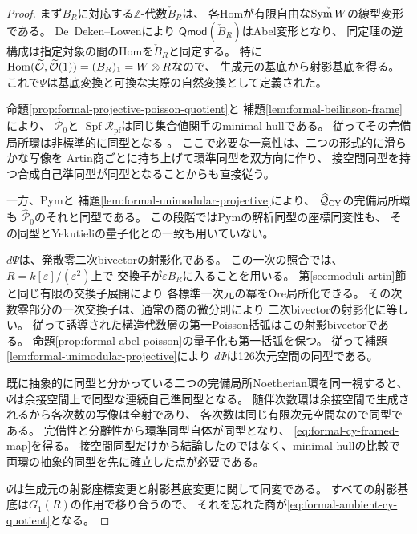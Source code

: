 \begin{proof}
まず$B_R$に対応する$\mathbb Z$-代数$\check B_R$は、
各Homが有限自由な$\check{\operatorname{Sym} W}$の線型変形である。
De~Deken--Lowen\cite[Proposition~4.4, Theorem~4.5]{DeDekenLowen}により
$\mathsf{Qmod}(\check B_R)$はAbel変形となり、
同定理の逆構成は指定対象の間のHomを$\check B_R$と同定する。
特に$\operatorname{Hom}(\widetilde{\mathcal O},\widetilde{\mathcal O}(1))=(B_R)_1=W\otimes R$なので、
生成元の基底から射影基底を得る。
これで$\Psi$は基底変換と可換な実際の自然変換として定義された。

命題\ref{prop:formal-projective-poisson-quotient}と
補題\ref{lem:formal-beilinson-frame}により、
$\widehat{\mathcal P}_0$と
$\operatorname{Spf}\mathcal R_{\mathrm{pf}}$は同じ集合値関手のminimal hullである。
従ってその完備局所環は非標準的に同型となる
\cite[Tag~06T5]{StacksFormal}。
ここで必要な一意性は、二つの形式的に滑らかな写像を
Artin商ごとに持ち上げて環準同型を双方向に作り、
接空間同型を持つ合成自己準同型が同型となることからも直接従う。

一方、Pym\cite[Proposition~2.9]{Pym}と
補題\ref{lem:formal-unimodular-projective}により、
$\widehat{\mathcal Q}_{\mathrm{CY}}$の完備局所環も
$\widehat{\mathcal P}_0$のそれと同型である。
この段階ではPymの解析同型の座標同変性も、
その同型とYekutieliの量子化との一致も用いていない。

$d\Psi$は、発散零二次bivectorの射影化である。
この一次の照合では、$R=k[\varepsilon]/(\varepsilon^2)$上で
交換子が$\varepsilon B_R$に入ることを用いる。
第\ref{sec:moduli-artin}節と同じ有限の交換子展開により
各標準一次元の冪をOre局所化できる。
その次数零部分の一次交換子は、通常の商の微分則により
二次bivectorの射影化に等しい。
従って誘導された構造代数層の第一Poisson括弧はこの射影bivectorである。
命題\ref{prop:formal-abel-poisson}の量子化も第一括弧を保つ。
従って補題\ref{lem:formal-unimodular-projective}により
$d\Psi$は126次元空間の同型である。

既に抽象的に同型と分かっている二つの完備局所Noetherian環を同一視すると、
$\Psi$は余接空間上で同型な連続自己準同型となる。
随伴次数環は余接空間で生成されるから各次数の写像は全射であり、
各次数は同じ有限次元空間なので同型である。
完備性と分離性から環準同型自体が同型となり、
\eqref{eq:formal-cy-framed-map}を得る。
接空間同型だけから結論したのではなく、minimal hullの比較で
両環の抽象的同型を先に確立した点が必要である。

$\Psi$は生成元の射影座標変更と射影基底変更に関して同変である。
すべての射影基底は$G_1(R)$の作用で移り合うので、
それを忘れた商が\eqref{eq:formal-ambient-cy-quotient}となる。
\end{proof}

